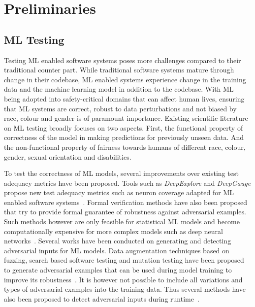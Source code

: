 \documentclass[acmsmall,screen,review,anonymous]{acmart}
\begin{document}

\section{Preliminaries}\label{sec:prelim}

\subsection{ML Testing}\label{sec:ml-testing}

Testing ML enabled software systems poses more challenges compared to their traditional counter part. While traditional software systems mature through change in their codebase, ML enabled systems experience change in the training data and the machine learning model in addition to the codebase. With ML being adopted into safety-critical domains that can affect human lives, ensuring that ML systems are correct, robust to data perturbations and not biased by race, colour and gender is of paramount importance. Existing scientific literature on ML testing broadly focuses on two aspects. First, the functional property of correctness of the model in making predictions for previously unseen data. And the non-functional property of fairness towards humans of different race, colour, gender, sexual orientation and disabilities.

To test the correctness of ML models, several improvements over existing test adequacy metrics have been proposed. Tools such as \textit{DeepExplore} and \textit{DeepGauge} propose new test adequacy metrics such as neuron coverage adapted for ML enabled software systems~\cite{pei2017deepexplore, ma2018deepgauge, gerasimou2020importance}. Formal verification methods have also been proposed that try to provide formal guarantee of robustness against adversarial examples. Such methods however are only feasible for statistical ML models and become computationally expensive for more complex models such as deep neural networks~\cite{zhu2021deepmemory, baluta2021scalable}. Several works have been conducted on generating and detecting adversarial inputs for ML models. Data augmentation techniques based on fuzzing, search based software testing and mutation testing have been proposed to generate adversarial examples that can be used during model training to improve its robustness~\cite{braiek2019deepevolution, gao2020fuzz, wang2021robot, zhang2020white}. It is however not possible to include all variations and types of adversarial examples into the training data. Thus several methods have also been proposed to detect adversarial inputs during runtime~\cite{xiao2021self, wang2020dissector, wang2019adversarial, berend2020cats}.
\end{document}
